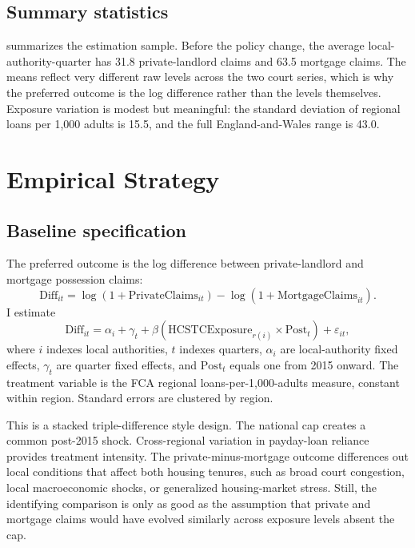 \documentclass[12pt]{article}
\begin{document}
\subsection{Summary statistics}



 summarizes the estimation sample. Before the policy change, the average local-authority-quarter has 31.8 private-landlord claims and 63.5 mortgage claims. The means reflect very different raw levels across the two court series, which is why the preferred outcome is the log difference rather than the levels themselves. Exposure variation is modest but meaningful: the standard deviation of regional loans per 1,000 adults is 15.5, and the full England-and-Wales range is 43.0.

\section{Empirical Strategy}

\subsection{Baseline specification}
The preferred outcome is the log difference between private-landlord and mortgage possession claims:
\begin{equation}
\text{Diff}_{it} = \log(1+\text{PrivateClaims}_{it}) - \log(1+\text{MortgageClaims}_{it}).
\end{equation}
I estimate
\begin{equation}
\text{Diff}_{it} = \alpha_i + \gamma_t + \beta \left( \text{HCSTCExposure}_{r(i)} \times \text{Post}_t \right) + \varepsilon_{it},
\end{equation}
where $i$ indexes local authorities, $t$ indexes quarters, $\alpha_i$ are local-authority fixed effects, $\gamma_t$ are quarter fixed effects, and $\text{Post}_t$ equals one from 2015 onward. The treatment variable is the FCA regional loans-per-1,000-adults measure, constant within region. Standard errors are clustered by region.

This is a stacked triple-difference style design. The national cap creates a common post-2015 shock. Cross-regional variation in payday-loan reliance provides treatment intensity. The private-minus-mortgage outcome differences out local conditions that affect both housing tenures, such as broad court congestion, local macroeconomic shocks, or generalized housing-market stress. Still, the identifying comparison is only as good as the assumption that private and mortgage claims would have evolved similarly across exposure levels absent the cap.
\end{document}
